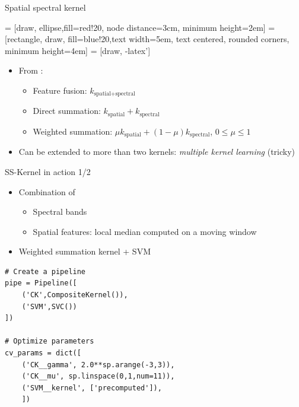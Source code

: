 \documentclass[10pt,aspectratio=1610,,color={dvipsnames,usenames,table},table]{beamer}
\begin{document}
\begin{frame}[label={sec:orgbc3a9cc}]{Spatial spectral kernel}
\begin{center}
   = [draw, ellipse,fill=red!20, node distance=3cm, minimum height=2em]
   = [rectangle, draw, fill=blue!20,text width=5em, text centered, rounded corners, minimum height=4em]
   = [draw, -latex']
\end{center}

\begin{itemize}
\item From \cite{1576697}:
\begin{itemize}
\item Feature fusion: \(k_{\text{spatial+spectral}}\)
\item Direct summation: \(k_{\text{spatial}} + k_{\text{spectral}}\)
\item Weighted summation: \(\mu k_{\text{spatial}} + (1-\mu)k_{\text{spectral}}\), \(0\leq \mu \leq 1\)
\end{itemize}
\item Can be extended to more than two kernels: \emph{multiple kernel learning} (tricky)
\end{itemize}
\end{frame}
\begin{frame}[fragile,label={sec:org3d71614}]{SS-Kernel in action 1/2}
 \begin{itemize}
\item Combination of
\begin{itemize}
\item Spectral bands
\item Spatial features: local median computed on a moving window
\end{itemize}
\item Weighted summation kernel + SVM
\end{itemize}

\begin{verbatim}
# Create a pipeline
pipe = Pipeline([
    ('CK',CompositeKernel()),
    ('SVM',SVC())
])

# Optimize parameters
cv_params = dict([
    ('CK__gamma', 2.0**sp.arange(-3,3)),
    ('CK__mu', sp.linspace(0,1,num=11)),
    ('SVM__kernel', ['precomputed']),
    ])
\end{verbatim}
\end{frame}
\end{document}
